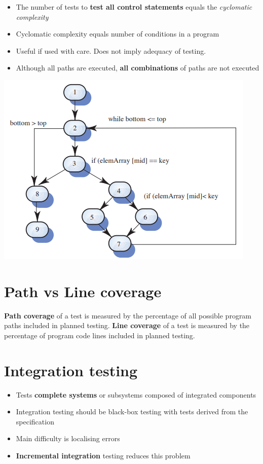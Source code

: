 \documentclass{article}
\begin{document}
\begin{itemize}
  \item The number of tests to \textbf{test all control statements} equals the \textit{cyclomatic complexity} 
  \item Cyclomatic complexity equals number of conditions in a program 
  \item Useful if used with care. Does not imply adequacy of testing. 
  \item Although all paths are executed, \textbf{all combinations} of paths are not executed
\end{itemize}

\begin{center}
  \includegraphics[scale=0.5]{search_flow_graph.png}
\end{center}

\section{Path vs Line coverage}

\begin{flushleft}
\textbf{Path coverage} of a test is measured by the percentage of all possible program paths included in planned testing. \textbf{Line coverage} of a test is measured by the percentage of program code lines included in planned testing.
\end{flushleft}

\section{Integration testing}

\begin{itemize}
  \item Tests \textbf{complete systems} or subsystems composed of integrated components 
  \item Integration testing should be black-box testing with tests derived from the specification 
  \item Main difficulty is localising errors 
  \item \textbf{Incremental integration} testing reduces this problem
\end{itemize}
\end{document}
